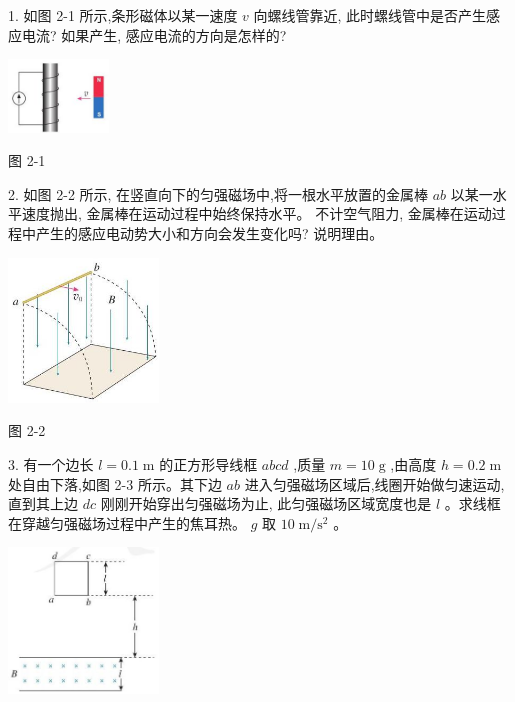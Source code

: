 \documentclass[10pt]{article}
\begin{document}
1. 如图 2-1 所示,条形磁体以某一速度 \(v\) 向螺线管靠近, 此时螺线管中是否产生感应电流? 如果产生, 感应电流的方向是怎样的?

\begin{center}
\includegraphics[max width=0.2\textwidth]{images/01910e72-c5b7-7ed5-a6d4-fb3a5faefc32_50_302766.jpg}
\end{center}

图 2-1

2. 如图 2-2 所示, 在竖直向下的匀强磁场中,将一根水平放置的金属棒 \({ab}\) 以某一水平速度抛出, 金属棒在运动过程中始终保持水平。 不计空气阻力, 金属棒在运动过程中产生的感应电动势大小和方向会发生变化吗? 说明理由。

\begin{center}
\includegraphics[max width=0.3\textwidth]{images/01910e72-c5b7-7ed5-a6d4-fb3a5faefc32_50_730436.jpg}
\end{center}

图 2-2

3. 有一个边长 \(l = {0.1}\mathrm{\;m}\) 的正方形导线框 \({abcd}\) ,质量 \(m = {10}\mathrm{\;g}\) ,由高度 \(h = {0.2}\mathrm{\;m}\) 处自由下落,如图 2-3 所示。其下边 \({ab}\) 进入匀强磁场区域后,线圈开始做匀速运动,直到其上边 \({dc}\) 刚刚开始穿出匀强磁场为止, 此匀强磁场区域宽度也是 \(l\) 。求线框在穿越匀强磁场过程中产生的焦耳热。 \(g\) 取 \({10}\mathrm{\;m}/{\mathrm{s}}^{2}\) 。

\begin{center}
\includegraphics[max width=0.3\textwidth]{images/01910e72-c5b7-7ed5-a6d4-fb3a5faefc32_50_424228.jpg}
\end{center}
\end{document}
